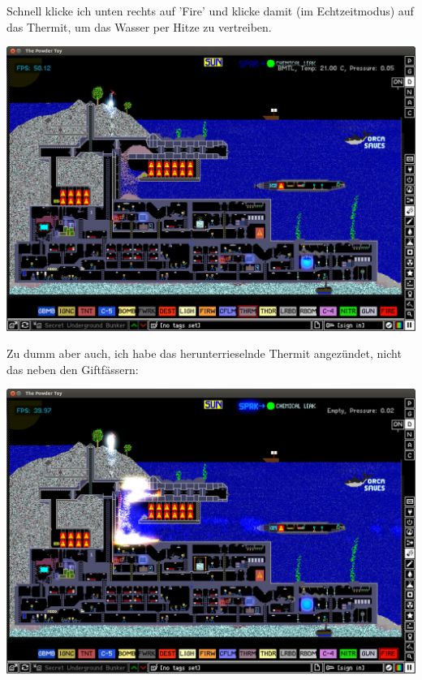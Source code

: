 \begin{multicols}{2}
Schnell klicke ich unten rechts auf 'Fire' und klicke damit (im Echtzeitmodus) auf das Thermit, um das Wasser per Hitze zu vertreiben.
\begin{center}
\includegraphics[width=\linewidth]{powdertoy/powdertoy-bu3.png}
\end{center}

Zu dumm aber auch, ich habe das herunterrieselnde Thermit angezündet, nicht das neben den Giftfässern:
\begin{center}
\includegraphics[width=\linewidth]{powdertoy/powdertoy-bu4.png}
\end{center}


\end{multicols}

